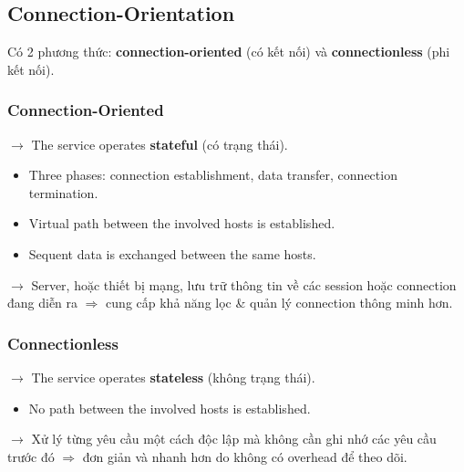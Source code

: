 
\subsection{Connection-Orientation}

Có 2 phương thức: \textbf{connection-oriented} (có kết nối) và \textbf{connectionless} (phi kết nối).

\subsubsection{Connection-Oriented}

\noindent
$\rightarrow$ The service operates \textbf{stateful} (có trạng thái).
\medskip

\begin{itemize}
    \item Three phases: connection establishment, data transfer, connection termination.
    \item Virtual path between the involved hosts is established.
    \item Sequent data is exchanged between the same hosts.
\end{itemize}

\noindent
$\rightarrow$ Server, hoặc thiết bị mạng, lưu trữ thông tin về các session hoặc connection đang diễn ra $\Rightarrow$ cung cấp khả năng lọc \& quản lý connection thông minh hơn.
\medskip

\subsubsection{Connectionless}

\noindent
$\rightarrow$ The service operates \textbf{stateless} (không trạng thái).

\begin{itemize}
    \item No path between the involved hosts is established.
\end{itemize}

\noindent
$\rightarrow$ Xử lý từng yêu cầu một cách độc lập mà không cần ghi nhớ các yêu cầu trước đó $\Rightarrow$ đơn giản và nhanh hơn do không có overhead để theo dõi.
\medskip


